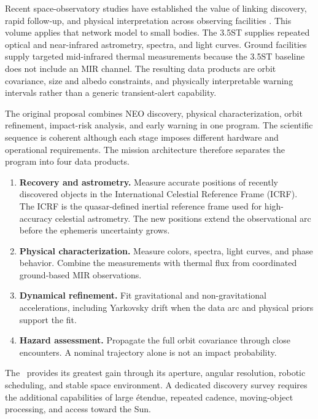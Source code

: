 Recent space-observatory studies have established the value of linking
discovery, rapid follow-up, and physical interpretation across observing
facilities \cite{roy2026IV,wevers2026IV}. This volume applies that network model
to small bodies. The 3.5ST supplies repeated optical and near-infrared
astrometry, spectra, and light curves. Ground facilities supply targeted
mid-infrared thermal measurements because the 3.5ST baseline does not include
an MIR channel. The resulting data products are orbit covariance, size and
albedo constraints, and physically interpretable warning intervals rather
than a generic transient-alert capability.

The original proposal combines NEO discovery, physical characterization,
orbit refinement, impact-risk analysis, and early warning in one program.
The scientific sequence is coherent although each stage imposes different
hardware and operational requirements. The mission architecture therefore
separates the program into four data products.

\begin{enumerate}[leftmargin=7mm,itemsep=2mm]
\item \textbf{\color{cTeal}Recovery and astrometry.} Measure accurate
positions of recently discovered objects in the International Celestial
Reference Frame (ICRF). The ICRF is the quasar-defined inertial reference
frame used for high-accuracy celestial astrometry. The new positions extend
the observational arc before the ephemeris uncertainty grows.
\item \textbf{\color{cGold}Physical characterization.} Measure colors,
spectra, light curves, and phase behavior. Combine the measurements with
thermal flux from coordinated ground-based MIR observations.
\item \textbf{\color{cOrange}Dynamical refinement.} Fit gravitational and
non-gravitational accelerations, including Yarkovsky drift when the data arc
and physical priors support the fit.
\item \textbf{\color{cRed}Hazard assessment.} Propagate the full orbit
covariance through close encounters. A nominal trajectory alone is not an
impact probability.
\end{enumerate}

The \facility\ provides its greatest gain through its aperture, angular
resolution, robotic scheduling, and stable space environment. A dedicated
discovery survey requires the additional capabilities of large étendue,
repeated cadence, moving-object processing, and access toward the Sun.

